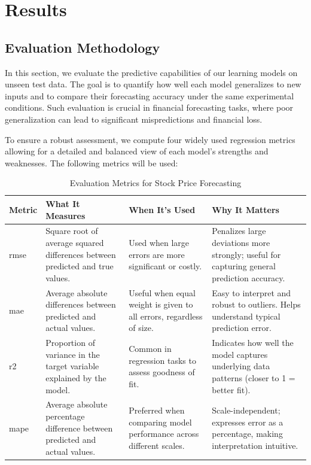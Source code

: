 \clearpage
\section{Results}

\subsection{Evaluation Methodology}

In this section, we evaluate the predictive capabilities of our learning models 
on unseen test data. The goal is to quantify how well each model generalizes to new inputs
and to compare their forecasting accuracy under the same experimental conditions. 
Such evaluation is crucial in financial forecasting tasks, where poor generalization 
can lead to significant mispredictions and financial loss.

To ensure a robust assessment, we compute four widely used regression metrics 
allowing for a detailed and balanced view of each model’s strengths and weaknesses. The  
following metrics will be used:

\begin{table}[H]
\centering
\caption{Evaluation Metrics for Stock Price Forecasting}
\label{tab:evaluation-metrics-usage}
\begin{tabular}{lp{3.5cm}p{3.5cm}p{4.5cm}}
\hline
\textbf{Metric} & \textbf{What It Measures} & \textbf{When It's Used} & \textbf{Why It Matters} \\
\hline\hline
\acrshort{rmse} &
  Square root of average squared differences between predicted and true values. &
  Used when large errors are more significant or costly. &
  Penalizes large deviations more strongly; useful for capturing general prediction accuracy. \\
\acrshort{mae} &
  Average absolute differences between predicted and actual values. &
  Useful when equal weight is given to all errors, regardless of size. &
  Easy to interpret and robust to outliers. Helps understand typical prediction error. \\
\acrshort{r2} &
  Proportion of variance in the target variable explained by the model. &
  Common in regression tasks to assess goodness of fit. &
  Indicates how well the model captures underlying data patterns (closer to 1 = better fit). \\
 \acrshort{mape} &
  Average absolute percentage difference between predicted and actual values. &
  Preferred when comparing model performance across different scales. &
  Scale-independent; expresses error as a percentage, making interpretation intuitive. \\
\hline
\end{tabular}
\end{table}


